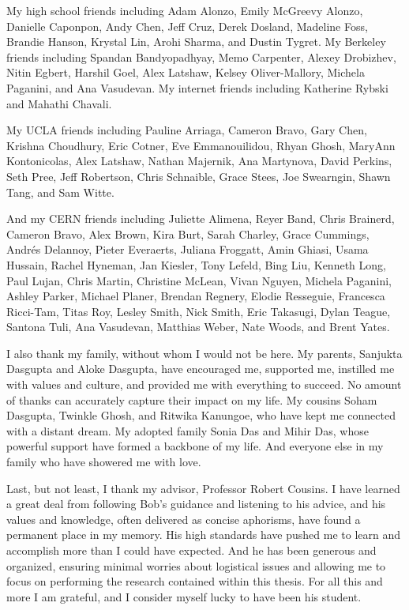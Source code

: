 
My high school friends including
Adam Alonzo,
Emily McGreevy Alonzo,
Danielle Caponpon,
Andy Chen,
Jeff Cruz,
Derek Dosland,
Madeline Foss,
Brandie Hanson,
Krystal Lin,
Arohi Sharma,
and
Dustin Tygret.
My Berkeley friends including
Spandan Bandyopadhyay,
Memo Carpenter,
Alexey Drobizhev,
Nitin Egbert,
Harshil Goel,
Alex Latshaw,
Kelsey Oliver-Mallory,
Michela Paganini,
and
Ana Vasudevan.
My internet friends including Katherine Rybski and Mahathi Chavali.

My UCLA friends including
Pauline Arriaga,
Cameron Bravo,
Gary Chen,
Krishna Choudhury,
Eric Cotner,
Eve Emmanouilidou,
Rhyan Ghosh,
MaryAnn Kontonicolas,
Alex Latshaw,
Nathan Majernik,
Ana Martynova,
David Perkins,
Seth Pree,
Jeff Robertson,
Chris Schnaible,
Grace Stees,
Joe Swearngin,
Shawn Tang,
and
Sam Witte.

And my CERN friends including
Juliette Alimena,
Reyer Band,
Chris Brainerd,
Cameron Bravo,
Alex Brown,
Kira Burt,
Sarah Charley,
Grace Cummings,
Andr\'{e}s Delannoy,
Pieter Everaerts,
Juliana Froggatt,
Amin Ghiasi,
Usama Hussain,
Rachel Hyneman,
Jan Kiesler,
Tony Lefeld,
Bing Liu,
Kenneth Long,
Paul Lujan,
Chris Martin,
Christine McLean,
Vivan Nguyen,
Michela Paganini,
Ashley Parker,
Michael Planer,
Brendan Regnery,
Elodie Resseguie,
Francesca Ricci-Tam,
Titas Roy,
Lesley Smith,
Nick Smith,
Eric Takasugi,
Dylan Teague,
Santona Tuli,
Ana Vasudevan,
Matthias Weber,
Nate Woods,
and
Brent Yates.

I also thank my family, without whom I would not be here. My parents, Sanjukta Dasgupta and Aloke Dasgupta, have encouraged me, supported me, instilled me with values and culture, and provided me with everything to succeed. No amount of thanks can accurately capture their impact on my life. My cousins Soham Dasgupta, Twinkle Ghosh, and Ritwika Kanungoe, who have kept me connected with a distant dream. My adopted family Sonia Das and Mihir Das, whose powerful support have formed a backbone of my life. And everyone else in my family who have showered me with love.

Last, but not least, I thank my advisor, Professor Robert Cousins.
I have learned a great deal from following Bob's guidance and listening to his advice, and his values and knowledge, often delivered as concise aphorisms, have found a permanent place in my memory.
His high standards have pushed me to learn and accomplish more than I could have expected.
And he has been generous and organized, ensuring minimal worries about logistical issues and allowing me to focus on performing the research contained within this thesis.
For all this and more I am grateful, and I consider myself lucky to have been his student.
